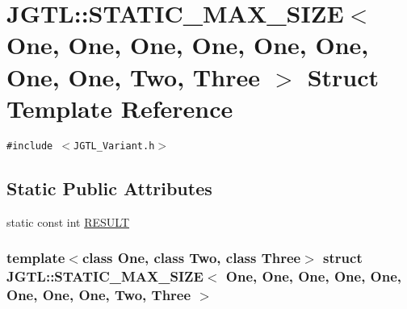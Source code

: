\hypertarget{struct_j_g_t_l_1_1_s_t_a_t_i_c___m_a_x___s_i_z_e_3_01_one_00_01_one_00_01_one_00_01_one_00_01_on0da18bc47224201889d1e0cafe760a2c}{
\section{JGTL::STATIC\_\-MAX\_\-SIZE$<$ One, One, One, One, One, One, One, One, Two, Three $>$ Struct Template Reference}
\label{struct_j_g_t_l_1_1_s_t_a_t_i_c___m_a_x___s_i_z_e_3_01_one_00_01_one_00_01_one_00_01_one_00_01_on0da18bc47224201889d1e0cafe760a2c}
}
{\tt \#include $<$JGTL\_\-Variant.h$>$}

\subsection*{Static Public Attributes}
\begin{CompactItemize}
\item 
static const int \hyperlink{struct_j_g_t_l_1_1_s_t_a_t_i_c___m_a_x___s_i_z_e_3_01_one_00_01_one_00_01_one_00_01_one_00_01_on0da18bc47224201889d1e0cafe760a2c_bca6174e9e13911ee264d948a915d565}{RESULT}
\end{CompactItemize}
\subsubsection*{template$<$class One, class Two, class Three$>$ struct JGTL::STATIC\_\-MAX\_\-SIZE$<$ One, One, One, One, One, One, One, One, Two, Three $>$}



